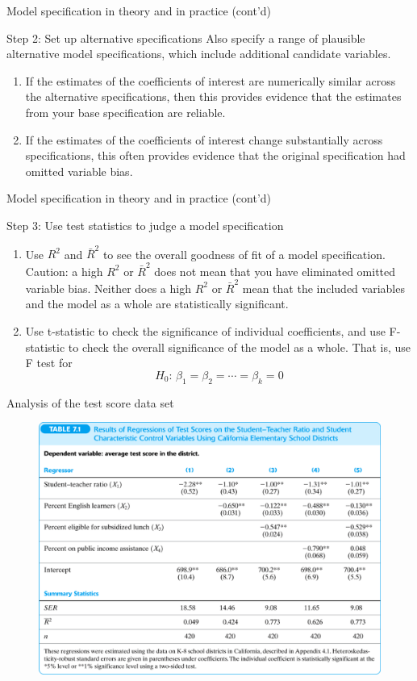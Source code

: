 \documentclass[presentation,10pt]{beamer}
\begin{document}
\begin{frame}[label={sec:org0e09e73}]{Model specification in theory and in practice (cont'd)}
\begin{block}{Step 2: Set up alternative specifications}
Also specify a range of plausible \alert{alternative model
specifications}, which include additional candidate variables.
\begin{enumerate}
\item If the estimates of the coefficients of interest are numerically
similar across the alternative specifications, then this
provides evidence that the estimates from your base
specification are reliable.
\item If the estimates of the coefficients of interest change
substantially across specifications, this often provides
evidence that the original specification had omitted variable
bias.
\end{enumerate}
\end{block}
\end{frame}

\begin{frame}[label={sec:org8239c50}]{Model specification in theory and in practice (cont'd)}
\begin{block}{Step 3: Use test statistics to judge a model specification}
\begin{enumerate}
\item Use \(R^2\) and \(\bar{R}^2\) to see the overall goodness of fit of
a model specification. Caution: a high \(R^2\) or \(\bar{R}^2\) does
not mean that you have eliminated omitted variable bias. Neither
does a high \(R^2\) or \(\bar{R}^2\) mean that the included
variables and the model as a whole are statistically
significant.
\item Use t-statistic to check the significance of individual
coefficients, and use F-statistic to check the overall
significance of the model as a whole. That is, use F test for
\[H_0:\, \beta_1 = \beta_2 = \cdots = \beta_k = 0 \]
\end{enumerate}
\end{block}
\end{frame}

\begin{frame}[shrink,label={sec:org0da7a15}]{Analysis of the test score data set}
\begin{figure}[htbp]
\centering
\includegraphics[width=.9\linewidth]{img/tab-7-1.png}
\end{figure}
\end{frame}
\end{document}
